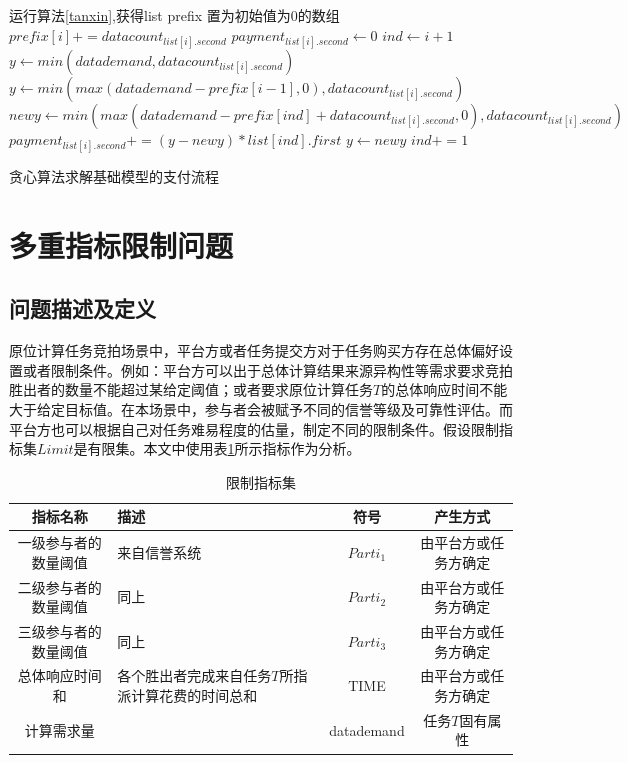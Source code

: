 \documentclass[promaster]{thesis-uestc}
\begin{document}
\begin{algorithm}[H]
    运行算法\ref{tanxin},获得list\;
    prefix 置为初始值为0的数组\;
    {
        $prefix[i]  += datacount_{list[i].second}$\;
    }
    {
        $payment_{list[i].second} \leftarrow 0$\;
        $ind \leftarrow i + 1$
        {
            $y \leftarrow min(datademand,datacount_{list[i].second})$\;
        }{
        $y \leftarrow min(max(datademand - prefix[i-1],0),datacount_{list[i].second})$\;
        }
        {
            $newy \leftarrow min(max(datademand - prefix[ind]+ datacount_{list[i].second},0),datacount_{list[i].second})$\;
            $payment_{list[i].second} += (y - newy)*list[ind].first$\;
            $y \leftarrow newy$\;
            $ind += 1$\;
        }
    }
\caption{贪心算法求解基础模型的支付流程}
\label{tanxin_zhifu}
\end{algorithm}

\section{多重指标限制问题}
\label{dptou}
\subsection{问题描述及定义}
    原位计算任务竞拍场景中，平台方或者任务提交方对于任务购买方存在总体偏好设置或者限制条件。例如：平台方可以出于总体计算结果来源异构性等需求要求竞拍胜出者的数量不能超过某给定阈值；或者要求原位计算任务$T$的总体响应时间不能大于给定目标值。在本场景中，参与者会被赋予不同的信誉等级及可靠性评估。而平台方也可以根据自己对任务难易程度的估量，制定不同的限制条件。假设限制指标集$Limit$是有限集。本文中使用表\ref{zhibiao}所示指标作为分析。

\newcommand{\tabincell}[2]{\begin{tabular}{@{}#1@{}}#2\end{tabular}} %

\begin{table}[h]
\caption{限制指标集}
\label{zhibiao}
\begin{tabular}{cp{10em}cc}
    \toprule
    指标名称& 描述&符号&产生方式\\
    \midrule
    一级参与者的数量阈值&来自信誉系统&$Parti_1$&由平台方或任务方确定\\
    二级参与者的数量阈值& 同上&$Parti_2$&由平台方或任务方确定\\
    三级参与者的数量阈值& 同上&$Parti_3$&由平台方或任务方确定\\
    总体响应时间和&各个胜出者完成来自任务$T$所指派计算花费的时间总和&TIME&由平台方或任务方确定\\
    计算需求量&&datademand&任务$T$固有属性\\
    \bottomrule
\end{tabular}
\end{table}
\end{document}
